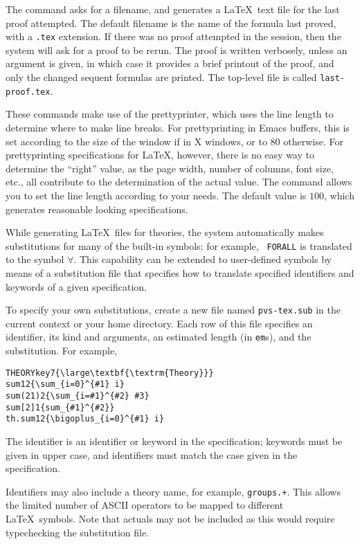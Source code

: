 The  command asks for a filename, and generates a \LaTeX\
text file for the last proof attempted.  The default filename is the name
of the formula last proved, with a \texttt{.tex} extension.  If there was
no proof attempted in the session, then the system will ask for a proof to
be rerun.  The proof is written verbosely, unless an argument is given, in
which case it provides a brief printout of the proof, and only the changed
sequent formulas are printed. The top-level file is called 
\texttt{last-proof.tex}.

These commands make use of the prettyprinter, which uses the line length to
determine where to make line breaks.  For prettyprinting in Emacs buffers,
this is set according to the size of the window if in X windows, or to
$80$ otherwise.  For prettyprinting specifications for \LaTeX, however,
there is no easy way to determine the ``right'' value, as the page width,
number of columns, font size, etc., all contribute to the determination of
the actual value.  The \cmd{latex-set-linelength} command allows you to
set the line length according to your needs.  The default value is $100$,
which generates reasonable looking specifications.

While generating \LaTeX\ files for theories, the system automatically
makes substitutions for many of the built-in symbols; for example, {\tt
FORALL} is translated to the symbol $\forall$.  This capability can be
extended to user-defined symbols by means of a substitution file that
specifies how to translate specified identifiers and keywords of a given
specification.

To specify your own substitutions, create a new file named
\texttt{pvs-tex.sub} in the current context or your home directory.  Each
row of this file specifies an identifier, its kind and arguments, an
estimated length (in \texttt{em}s), and the substitution.  For example,
{\small\begin{alltt}
  THEORY key 7 \verb|{\large\textbf{\textrm{Theory}}}|
  sum 1 2 \verb|{\sum_{i=0}^{#1} i}|
  sum (2 1) 2 \verb|{\sum_{i=#1}^{#2} #3}|
  sum [2] 1 \verb|{sum_{#1}^{#2}}|
  th.sum 1 2 \verb|{\bigoplus_{i=0}^{#1} i}|
\end{alltt}}
The identifier is an identifier or keyword in the specification;
keywords must be given in upper case, and identifiers must match the
case given in the specification.

Identifiers may also include a theory name, for example,
\texttt{groups.+}.  This allows the limited number of ASCII operators to
be mapped to different \LaTeX\ symbols.  Note that actuals may not be
included as this would require typechecking the substitution file.

